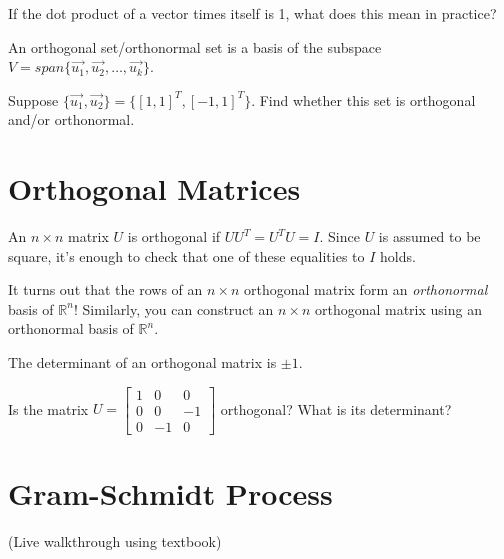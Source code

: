 \documentclass[11pt]{exam}
\begin{document}
    \vspace{20px}
    \begin{questions}
        \item If the dot product of a vector times itself is 1, what does this mean in practice?
        \item An orthogonal set/orthonormal set is a basis of the subspace $V = span \{ \vec{u_1}, \vec{u_2}, \dots, \vec{u_k} \}$.
        \item Suppose $\{ \vec{u_1}, \vec{u_2} \} = \{ [1,1]^T, [-1, 1]^T \}$. Find whether this set is orthogonal and/or orthonormal.
    \end{questions}
    

\pagebreak
\section{Orthogonal Matrices}
    
    \vspace{20px}
    An $n \times n$ matrix $U$ is orthogonal if $U U^T = U^T U = I$. Since $U$ is assumed to be square, it's enough to check that one of these
    equalities to $I$ holds.

    It turns out that the rows of an $n \times n$ orthogonal matrix form an \textit{orthonormal} basis of $\mathbb{R}^n$! Similarly, you can construct
    an $n \times n$ orthogonal matrix using an orthonormal basis of $\mathbb{R}^n$.

    The determinant of an orthogonal matrix is $\pm 1$.

    \vspace{20px}
    \begin{questions}
        \item Is the matrix $U = \begin{bmatrix} 1 & 0 & 0 \\ 0 & 0 & -1 \\ 0 & -1 & 0 \end{bmatrix}$ orthogonal? What is its determinant?
    \end{questions}

\pagebreak
\section{Gram-Schmidt Process}
    \vspace{20px}
    (Live walkthrough using textbook)
\end{document}
